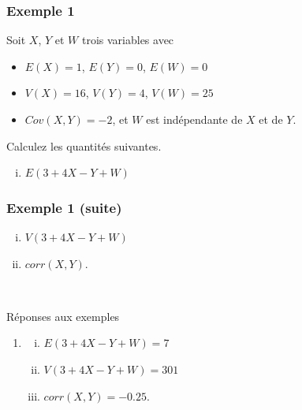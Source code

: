 \documentclass{BeamerTemplate}
\begin{document}
\begin{frame}[t]
 \frametitle{Exemple 1}

{\small
Soit $X$, $Y$ et $W$ trois variables avec
\begin{itemize}
\item $E(X)=1$, $E(Y)=0$, $E(W)=0$
\item $V(X)=16$, $V(Y)=4$, $V(W)=25$
\item $Cov(X,Y)=-2$, et $W$ est indépendante de $X$ et de $Y$.
\end{itemize}
Calculez les quantités suivantes.

\begin{enumerate}[(i)]\itemsep 9mm
\item $E(3+4X-Y+W)$
\end{enumerate}
}
\end{frame}

\begin{frame}[t]
 \frametitle{Exemple 1 (suite)}

\begin{enumerate}[(i)]\itemsep 3cm
\item[(ii)] $V(3+4X-Y+W)$
\item[(iii)] $corr(X,Y)$.
\end{enumerate}

{\ }
\end{frame}



\begin{frame}[t]{Réponses aux exemples}

{\scriptsize
\begin{enumerate}
  \item
        \begin{enumerate}[(i)]
        \item $E(3+4X-Y+W)=7$
        \item$V(3+4X-Y+W)=301$
        \item $corr(X,Y)=-0.25$.
        \end{enumerate}


 \end{enumerate}
 }
\end{frame}
\end{document}
